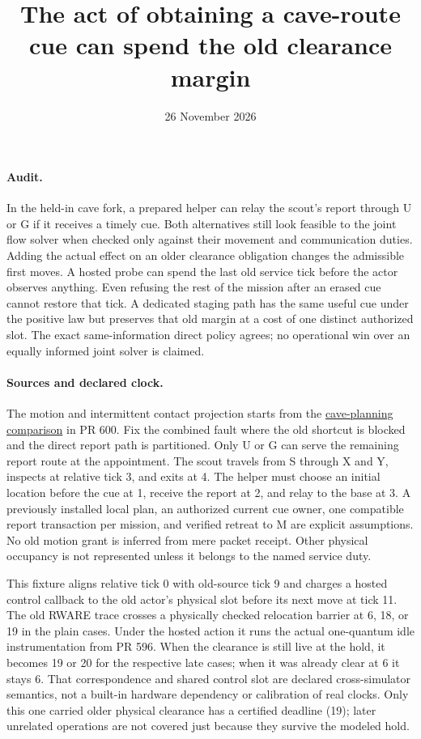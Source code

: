 \documentclass[11pt]{article}
\begin{document}
\title{The act of obtaining a cave-route cue can spend the old clearance margin}
\author{}
\date{26 November 2026}
\maketitle

\paragraph{Audit.}
In the held-in cave fork, a prepared helper can relay the scout's
report through U or G if it receives a timely cue. Both alternatives
still look feasible to the joint flow solver when checked only
against their movement and communication duties. Adding the actual
effect on an older clearance obligation changes the admissible
first moves. A hosted probe can spend the last old service tick
before the actor observes anything. Even refusing the rest of the
mission after an erased cue cannot restore that tick. A dedicated
staging path has the same useful cue under the positive law but
preserves that old margin at a cost of one distinct authorized slot.
The exact same-information direct policy agrees; no operational
win over an equally informed joint solver is claimed.

\paragraph{Sources and declared clock.}
The motion and intermittent contact projection starts from the
\href{https://ntrs.nasa.gov/citations/20220001447}{cave-planning
comparison} in PR 600. Fix the combined fault where the old shortcut
is blocked and the direct report path is partitioned. Only U or G
can serve the remaining report route at the appointment. The scout
travels from S through X and Y, inspects at relative tick 3, and
exits at 4. The helper must choose an initial location before the
cue at 1, receive the report at 2, and relay to the base at 3.
A previously installed local plan, an authorized current cue owner,
one compatible report transaction per mission, and verified retreat
to M are explicit assumptions. No old motion grant is inferred from
mere packet receipt. Other physical occupancy is not represented
unless it belongs to the named service duty.

This fixture aligns relative tick 0 with old-source tick 9 and
charges a hosted control callback to the old actor's physical slot
before its next move at tick 11. The old RWARE trace crosses a
physically checked relocation barrier at 6, 18, or 19 in the plain
cases. Under the hosted action it runs the actual one-quantum idle
instrumentation from PR 596. When the clearance is still live at
the hold, it becomes 19 or 20 for the respective late cases; when
it was already clear at 6 it stays 6. That correspondence and
shared control slot are declared cross-simulator semantics, not a
built-in hardware dependency or calibration of real clocks. Only
this one carried older physical clearance has a certified deadline
(19); later unrelated operations are not covered just because they
survive the modeled hold.
\end{document}
